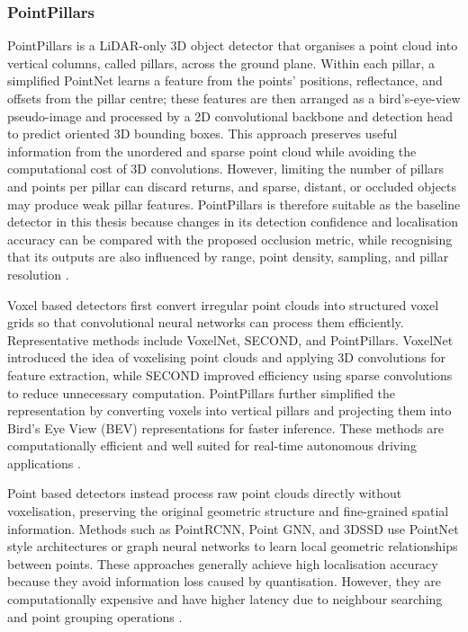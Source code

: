 \documentclass[12pt,a4paper]{article}
\begin{document}
\subsubsection{PointPillars}

PointPillars is a LiDAR-only 3D object detector that organises a point cloud into vertical columns, called pillars, across the ground plane. Within each pillar, a simplified PointNet learns a feature from the points' positions, reflectance, and offsets from the pillar centre; these features are then arranged as a bird's-eye-view pseudo-image and processed by a 2D convolutional backbone and detection head to predict oriented 3D bounding boxes. This approach preserves useful information from the unordered and sparse point cloud while avoiding the computational cost of 3D convolutions. However, limiting the number of pillars and points per pillar can discard returns, and sparse, distant, or occluded objects may produce weak pillar features. PointPillars is therefore suitable as the baseline detector in this thesis because changes in its detection confidence and localisation accuracy can be compared with the proposed occlusion metric, while recognising that its outputs are also influenced by range, point density, sampling, and pillar resolution \cite{bib_ref_28}.

Voxel based detectors first convert irregular point clouds into
structured voxel grids so that convolutional neural networks can process
them efficiently. Representative methods include VoxelNet, SECOND, and
PointPillars. VoxelNet introduced the idea of voxelising point clouds
and applying 3D convolutions for feature extraction, while SECOND
improved efficiency using sparse convolutions to reduce unnecessary
computation. PointPillars further simplified the representation by
converting voxels into vertical pillars and projecting them into Bird's
Eye View (BEV) representations for faster inference. These methods are
computationally efficient and well suited for real-time autonomous
driving applications \cite{bib_ref_2}.

Point based detectors instead process raw point clouds directly without
voxelisation, preserving the original geometric structure and fine-grained spatial information. Methods such as PointRCNN, Point GNN, and
3DSSD use PointNet style architectures or graph neural networks to learn
local geometric relationships between points. These approaches generally
achieve high localisation accuracy because they avoid information loss
caused by quantisation. However, they are computationally expensive and
have higher latency due to neighbour searching and point grouping
operations \cite{bib_ref_2}.
\end{document}
